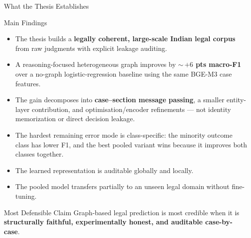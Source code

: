 \documentclass[aspectratio=169,11pt]{beamer}
\newenvironment{tightitemize}{
  \begin{itemize}
    \setlength{\itemsep}{2pt}
    \setlength{\parskip}{0pt}
}{\end{itemize}}
\newcommand{\highlight}[1]{\textcolor{ThesisBlue}{\textbf{#1}}}
\begin{document}
\begin{frame}{What the Thesis Establishes}
  \scriptsize
  \begin{block}{Main Findings}
    \begin{tightitemize}
      \item The thesis builds a \highlight{legally coherent, large-scale Indian legal corpus} from raw judgments with explicit leakage auditing.
      \item A reasoning-focused heterogeneous graph improves by $\sim$\,\highlight{$+6$ pts macro-F1} over a no-graph logistic-regression baseline using the same BGE-M3 case features.
      \item The gain decomposes into \highlight{case--section message passing}, a smaller entity-layer contribution, and optimisation/encoder refinements --- not identity memorization or direct decision leakage.
      \item The hardest remaining error mode is class-specific: the minority outcome class has lower F1, and the best pooled variant wins because it improves both classes together.
      \item The learned representation is auditable globally and locally.
      \item The pooled model transfers partially to an unseen legal domain without fine-tuning.
    \end{tightitemize}
  \end{block}
  \begin{block}{Most Defensible Claim}
    Graph-based legal prediction is most credible when it is \highlight{structurally faithful, experimentally honest, and auditable case-by-case}.
  \end{block}
\end{frame}
\end{document}
